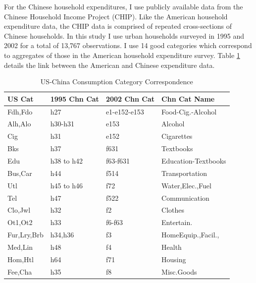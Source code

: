 \documentclass[12pt]{article}
\begin{document}
For the Chinese household expenditures, I use publicly available data from the Chinese Household Income Project (CHIP). \citep{CHIP2002} Like the American household expenditure data, the CHIP data is comprised of repeated cross-sections of Chinese households.  In this study I use urban households surveyed in 1995 and 2002 for a total of 13,767 observations.  I use 14 good categories which correspond to aggregates of those in the American household expenditure survey.   Table \ref{tab:chncons} details the link between the American and Chinese expenditure data.
\begin{table}
    \centering
    \footnotesize
 \begin{tabular}{llll}
        \hline \hline
        US Cat & 1995 Chn Cat & 2002 Chn Cat & Chn Cat Name  \\
        \hline 
        Fdh,Fdo     & h27        & e1-e152-e153 & Food-Cig.-Alcohol\\
        Alh,Alo     & h30-h31    & e153         & Alcohol\\
        Cig         & h31        & e152         & Cigarettes\\
        Bks         & h37        & f631         & Textbooks\\
        Edu         & h38 to h42 & f63-f631     & Education-Textbooks\\
        Bus,Car\footnotemark{}    & h44        & f514         & Transportation\\
        Utl         & h45 to h46 & f72          & Water,Elec.,Fuel\\
        Tel         & h47        & f522         & Communication\\
        Clo,Jwl     & h32        & f2           & Clothes\\
        Ot1,Ot2     & h33        & f6-f63       & Entertain.\\
        Fur,Lry,Brb & h34,h36    & f3           & HomeEquip.,Facil.,\\
        Med,Lin     & h48        & f4           & Health\\
        Hom,Htl     & h64        & f71          & Housing\\
        Fee,Cha     & h35        & f8           & Misc.Goods\\\hline
 \end{tabular}
    \caption{US-China Consumption Category Correspondence}
    \label{tab:chncons}
\end{table}

\end{document}
